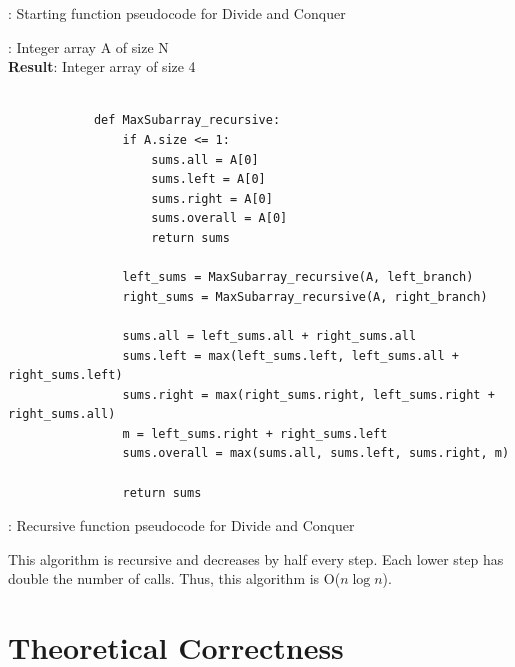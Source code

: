 \documentclass[a4paper,10pt]{article}
\begin{document}
			\begin{center}
			: Starting function pseudocode for Divide and Conquer
			\end{center}

			\vspace{1em}
			
			: Integer array A of size N \\
			{\bf Result}: Integer array of size 4

			\begin{minipage}[!h]{6in}
			\begin{verbatim}

			def MaxSubarray_recursive:
			    if A.size <= 1:
			        sums.all = A[0]
			        sums.left = A[0]
			        sums.right = A[0]
			        sums.overall = A[0]
			        return sums

			    left_sums = MaxSubarray_recursive(A, left_branch)
			    right_sums = MaxSubarray_recursive(A, right_branch)

			    sums.all = left_sums.all + right_sums.all
			    sums.left = max(left_sums.left, left_sums.all + right_sums.left)
			    sums.right = max(right_sums.right, left_sums.right + right_sums.all)
			    m = left_sums.right + right_sums.left
			    sums.overall = max(sums.all, sums.left, sums.right, m)

			    return sums
			\end{verbatim}
			\end{minipage}

			\begin{center}
			: Recursive function pseudocode for Divide and Conquer
			\end{center}

			\vspace{1em}

			\noindent This algorithm is recursive and decreases by half every step. Each lower step has double the number of calls. Thus, this algorithm is O($n \log n$).


	\newpage
	\section{Theoretical Correctness}
\end{document}

